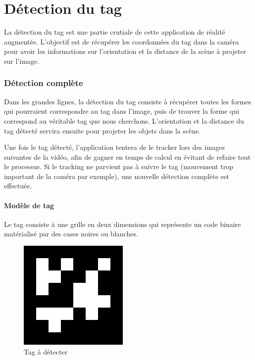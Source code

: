 \newpage
\part{Détection du tag}

La détection du tag est une partie crutiale de cette application de réalité augmentée. L'objectif est de récupérer les coordonnées du tag dans la caméra pour avoir les informations sur l'orientation et la distance de la scène à projeter sur l'image.

    \section{Détection complète}

    Dans les grandes lignes, la détection du tag consiste à récupérer toutes les formes qui pourraient correspondre au tag dans l'image, puis de trouver la forme qui correspond au véritable tag que nous cherchons. L'orientation et la distance du tag détecté servira ensuite pour projeter les objets dans la scène.

    Une fois le tag détecté, l'application tentera de le tracker lors des images suivantes de la vidéo, afin de gagner en temps de calcul en évitant de refaire tout le processus. Si le tracking ne parvient pas à suivre le tag (mouvement trop important de la caméra par exemple), une nouvelle détection complète est effectuée.

        \subsection{Modèle de tag}

        Le tag consiste à une grille en deux dimensions qui représente un code binaire matérialisé par des cases noires ou blanches.

        \begin{figure}[!h]
            \centering
            \includegraphics[scale=0.25]{img/marker.jpeg}
            \caption{Tag à détecter}
        \end{figure}

